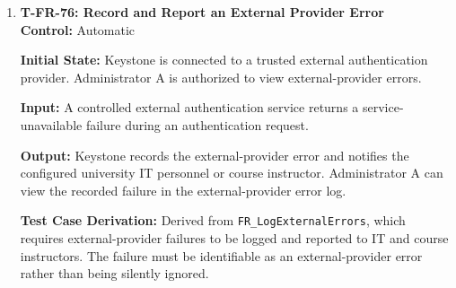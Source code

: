 \documentclass[12pt, titlepage]{article}
\begin{document}
\begin{enumerate}
\textbf{Control:} Automatic

\textbf{Initial State:} Supervisor A has an authenticated Keystone session and owns a proposal titled Autonomous Waste Sorting System with status ``Draft''. The proposal contains valid information and has not been deleted.

\textbf{Input:} Supervisor A attempts to delete the proposal but does not successfully complete the requested identity re-verification.

\textbf{Output:} The system requests identity re-verification before performing the deletion. Because re-verification is not completed, the proposal is not deleted and its existing information remains unchanged.

\textbf{Test Case Derivation:} Derived from \texttt{FR\_ReverifyUsers}, which requires additional identity verification before deleting proposals and other sensitive actions. The test verifies that an existing authenticated session alone is insufficient to authorize proposal deletion.

\textbf{How Test Will Be Performed:} Configure Supervisor A and the draft proposal. Using Playwright, authenticate as Supervisor A and initiate deletion. Verify the re-verification challenge appears. Cancel or fail the challenge and verify that the proposal remains accessible and unchanged.

\item \label{T-FR-76}\textbf{T-FR-76: Record and Report an External Provider Error}\\

\textbf{Control:} Automatic

\textbf{Initial State:} Keystone is connected to a trusted external authentication provider. Administrator A is authorized to view external-provider errors.

\textbf{Input:} A controlled external authentication service returns a service-unavailable failure during an authentication request.

\textbf{Output:} Keystone records the external-provider error and notifies the configured university IT personnel or course instructor. Administrator A can view the recorded failure in the external-provider error log.

\textbf{Test Case Derivation:} Derived from \texttt{FR\_LogExternalErrors}, which requires external-provider failures to be logged and reported to IT and course instructors. The failure must be identifiable as an external-provider error rather than being silently ignored.


\end{enumerate}
\end{document}
